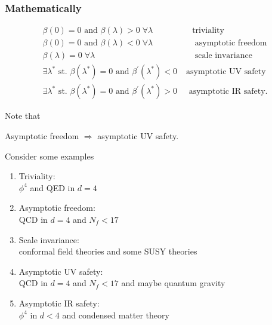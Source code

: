 \subsubsection{Mathematically}
\begin{mybox}{}
	\begin{align}
		\beta(0) = 0 \text{ and } \beta(\lambda)>0 \; \forall \lambda& \quad \text{triviality}\\
		\beta(0)=0 \text{ and } \beta(\lambda)<0 \; \forall \lambda&\quad \text{ asymptotic freedom}\\
		\beta(\lambda)=0 \; \forall \lambda& \quad \text{ scale invariance }\\
		\exists \lambda^* \text{ st. } \beta(\lambda^*)=0 \text{ and } \beta^\prime(\lambda^*)<0& \; \text{asymptotic UV safety} \\
		\exists \lambda^* \text{ st. } \beta(\lambda^*)=0 \text{ and } \beta^\prime(\lambda^*) >0& \; \text{ asymptotic IR safety}.
	\end{align}
\end{mybox}
Note that
\begin{statements}
	Asymptotic freedom $\Rightarrow$ asymptotic UV safety.
\end{statements}
Consider some examples
\begin{enumerate}
	\item Triviality:\\
	$\phi^4$ and QED in $d=4$
	\item Asymptotic freedom:\\
	QCD in $d=4$ and $N_f<17$
	\item Scale invariance:\\
	conformal field theories and some SUSY theories
	\item Asymptotic UV safety:\\
	QCD in $d=4$ and $N_f <17$ and maybe quantum gravity
	\item Asymptotic IR safety:\\
	$\phi^4$ in $d<4$ and condensed matter theory
\end{enumerate}
